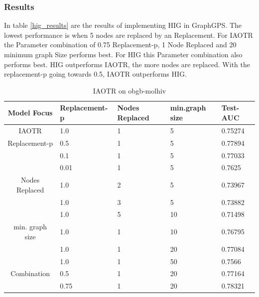 \subsubsection{Results}
In table \ref{hig_results} are the results of implementing HIG in GraphGPS. The lowest performance is when 5 nodes are replaced by an Replacement. For IAOTR the Parameter combination of 0.75 Replacement-p, 1 Node Replaced and 20 minimum graph Size performs best. For HIG  this Parameter combination also performs best. HIG outperforms IAOTR, the more nodes are replaced. With the replacement-p going towards 0.5, IAOTR outperforms HIG.
\begin{table}[ht!]
    \centering
    \caption{IAOTR on obgb-molhiv}
    \label{loss_results}
    \begin{tabular}{c || l|l|l|l|}
        Model Focus        & Replacement-p & Nodes Replaced & min.graph size & Test-AUC \\
        \hline
        \hline
        IAOTR       & 1.0             & 1                  & 5              & 0.75274  \\
        \hline
        Replacement-p    & 0.5             & 1                  & 5              & 0.77894  \\
                           & 0.1             & 1                  & 5              & 0.77033  \\
                           & 0.01            & 1                  & 5              & 0.7625   \\
        \hline
        Nodes Replaced & 1.0             & 2                  & 5              & 0.73967  \\
                           & 1.0             & 3                  & 5              & 0.73882  \\
                           & 1.0             & 5                  & 10             & 0.71498  \\
        \hline
        min. graph size    & 1.0             & 1                  & 10             & 0.76795  \\
                           & 1.0             & 1                  & 20             & 0.77084  \\
                           & 1.0             & 1                  & 50             & 0.7566   \\
        \hline
        Combination        & 0.5             & 1                  & 20             & 0.77164  \\
                           & 0.75            & 1                  & 20             & 0.78321  \\
    \end{tabular}
\end{table}

